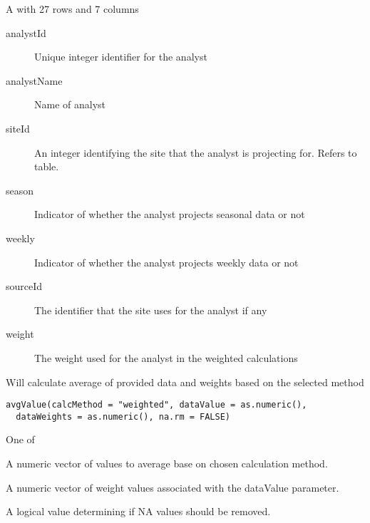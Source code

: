 \documentclass[a4paper]{book}
\begin{document}
\begin{Format}
A  with 27 rows and 7 columns
\begin{description}

\item[analystId] Unique integer identifier for the analyst
\item[analystName] Name of analyst
\item[siteId] An integer identifying the site that the analyst is projecting
for. Refers to  table.
\item[season] Indicator of whether the analyst projects seasonal data or not
\item[weekly] Indicator of whether the analyst projects weekly data or not
\item[sourceId] The identifier that the site uses for the analyst if any
\item[weight] The weight used for the analyst in the weighted calculations

\end{description}
\end{Format}
%
\begin{Description}\relax
Will calculate average of provided data and weights based on the selected
method
\end{Description}
%
\begin{Usage}
\begin{verbatim}
avgValue(calcMethod = "weighted", dataValue = as.numeric(),
  dataWeights = as.numeric(), na.rm = FALSE)
\end{verbatim}
\end{Usage}
%
\begin{Arguments}
\begin{ldescription}
\item[\code{calcMethod}] One of 

\item[\code{dataValue}] A numeric vector of values to average base on chosen calculation
method.

\item[\code{dataWeights}] A numeric vector of weight values associated with the
dataValue parameter.

\item[\code{na.rm}] A logical value determining if NA values should be removed.
\end{ldescription}
\end{Arguments}
\end{document}

